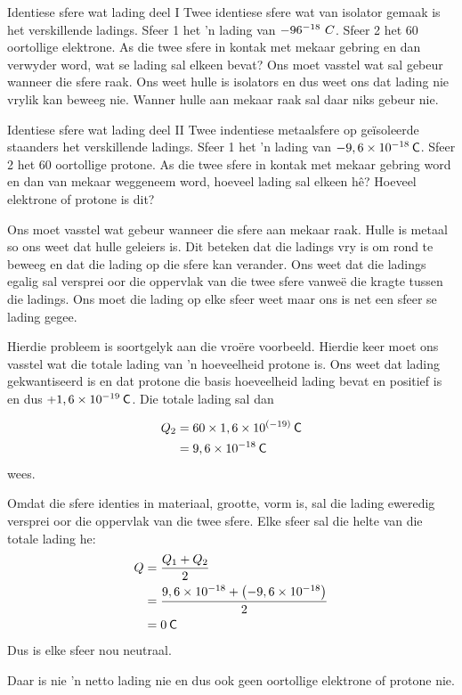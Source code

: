 \begin{wex}
{Identiese sfere wat lading deel I}
{
Twee identiese sfere wat van isolator gemaak is het verskillende ladings. Sfeer 1 het 'n lading van $-96\time10^{-18}~C$. Sfeer 2 het 60 oortollige elektrone. As die twee sfere in kontak met mekaar gebring en dan verwyder word, wat se lading sal elkeen bevat? 
}
{
Ons moet vasstel wat sal gebeur wanneer die sfere raak. Ons weet hulle is isolators en dus weet ons dat lading nie vrylik kan beweeg nie. Wanner hulle aan mekaar raak sal daar niks gebeur nie. 
}\end{wex}


\begin{wex}{Identiese sfere wat lading deel II}
{
Twee indentiese metaalsfere op ge\"isoleerde staanders het verskillende ladings. Sfeer 1 het 'n lading van $-9,6\ensuremath{\times}{10}^{-18}\phantom{\rule{2pt}{0ex}}\mathsf{C}$. Sfeer 2 het 60 oortollige protone. As die twee sfere in kontak met mekaar gebring word en dan van mekaar weggeneem word, hoeveel lading sal elkeen h\^e? Hoeveel elektrone of protone is dit?
}
{
Ons moet vasstel wat gebeur wanneer die sfere aan mekaar raak. Hulle is metaal so ons weet dat hulle geleiers is. Dit beteken dat die ladings vry is om rond te beweeg en dat die lading op die sfere kan verander. Ons weet dat die ladings egalig sal versprei oor die oppervlak van die twee sfere vanwe\"e die kragte tussen die ladings. Ons moet die lading op elke sfeer weet maar ons is net een sfeer se lading gegee.

Hierdie probleem is soortgelyk aan die vro\"ere voorbeeld. Hierdie keer moet ons vasstel wat die totale lading van 'n hoeveelheid protone is. Ons weet dat lading gekwantiseerd is en dat protone die basis hoeveelheid lading bevat en positief is en dus $+1,6\ensuremath{\times}{10}^{-19}\phantom{\rule{2pt}{0ex}}\mathsf{C}$. Die totale lading sal dan

\begin{align*}
{Q}_{2} &= 60\ensuremath{\times}1,6\ensuremath{\times}{10}^{\left(-19\right)}\phantom{\rule{2pt}{0ex}}\mathsf{C}\\ 
&= 9,6\ensuremath{\times}{10}^{-18}\phantom{\rule{2pt}{0ex}}\mathsf{C}
\end{align*}
wees.\par
Omdat die sfere identies in materiaal, grootte, vorm is, sal die lading eweredig versprei oor die oppervlak van die twee sfere. Elke sfeer sal die helte van die totale lading he:
\begin{align*}
Q &= \dfrac{{Q}_{1}+{Q}_{2}}{2}\\ 
  &= \dfrac{9,6\ensuremath{\times}{10}^{-18}+\left(-9,6\ensuremath{\times}{10}^{-18}\right)}{2}\\ 
  &= 0\phantom{\rule{2pt}{0ex}}\mathsf{C}
\end{align*}
Dus is elke sfeer nou neutraal.\par

Daar is nie 'n netto lading nie en dus ook geen oortollige elektrone of protone nie.
}
\end{wex}


